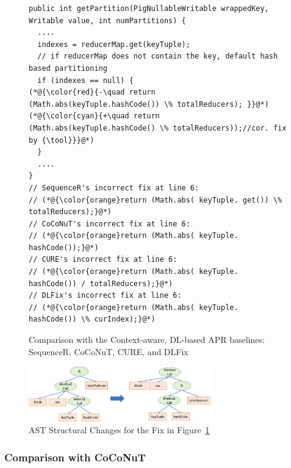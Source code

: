 \begin{figure}[t]
	\centering
	\begin{lstlisting}[]
public int getPartition(PigNullableWritable wrappedKey, Writable value, int numPartitions) {
  ....
  indexes = reducerMap.get(keyTuple);
  // if reducerMap does not contain the key, default hash based partitioning
  if (indexes == null) {
(*@{\color{red}{-\quad return (Math.abs(keyTuple.hashCode()) \% totalReducers);	}}@*)
(*@{\color{cyan}{+\quad return (Math.abs(keyTuple.hashCode() \% totalReducers));//cor. fix by {\tool}}}@*)
  }
  ....
}
// SequenceR's incorrect fix at line 6:
// (*@{\color{orange}return (Math.abs( keyTuple. get()) \% totalReducers);}@*)
// CoCoNuT's incorrect fix at line 6:
// (*@{\color{orange}return (Math.abs( keyTuple. hashCode());}@*)
// CURE's incorrect fix at line 6:
// (*@{\color{orange}return (Math.abs( keyTuple. hashCode()) / totalReducers);}@*)
// DLFix's incorrect fix at line 6:
// (*@{\color{orange}return (Math.abs( keyTuple. hashCode()) \% curIndex);}@*)
	\end{lstlisting}
        \vspace{-15pt}
	\caption{Comparison with the Context-aware, DL-based APR baselines: SequenceR, CoCoNuT, CURE, and DLFix}
	\label{example_3}
\end{figure}


\begin{figure}[t]
	\centering
	\includegraphics[width=3.1in]{graphs/example_3_v2.png}
        \vspace{-9pt}
	\caption{AST Structural Changes for the Fix in Figure~\ref{example_3}}
	\label{tree-change}
\end{figure}


\subsubsection{\bf Comparison with CoCoNuT}

